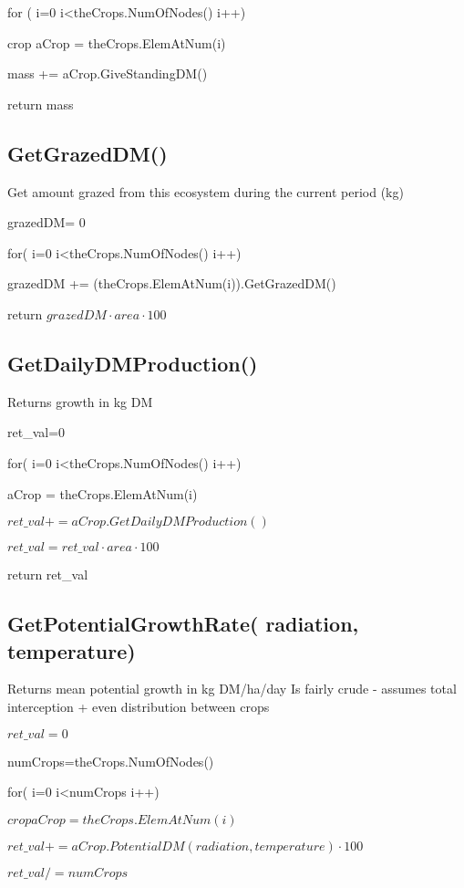 \documentclass[%
]{scrartcl}
\begin{document}
{{{  \quad 	for ( i=0 i<theCrops.NumOfNodes() i++)
   	
   \quad  \quad     crop  aCrop = theCrops.ElemAtNum(i)
         
    \quad \quad      mass += aCrop.GiveStandingDM()

   return mass


\subsection{GetGrazedDM()}
	Get amount grazed from this ecosystem during the current period (kg)
	
     grazedDM=  0
     
   for( i=0 i<theCrops.NumOfNodes() i++)
   
	 \quad	  grazedDM += (theCrops.ElemAtNum(i)).GetGrazedDM()
	 
	return $grazedDM  \cdot  area  \cdot  100$


\subsection{GetDailyDMProduction()}
Returns growth in kg DM

	  ret\_val=0
	  
   for( i=0 i<theCrops.NumOfNodes() i++)

    \quad	  aCrop = theCrops.ElemAtNum(i)
    
   \quad   $ ret\_val+=aCrop.GetDailyDMProduction()$

   $ret\_val  =ret\_val \cdot area  \cdot  100$
   
   return ret\_val

\subsection{GetPotentialGrowthRate(  radiation,   temperature)}
Returns mean potential growth in kg DM/ha/day
Is fairly crude - assumes total interception + even distribution between crops

	$  ret\_val=0$
	  
    numCrops=theCrops.NumOfNodes()
    
   for( i=0 i<numCrops i++)
   
   	 \quad $ crop    aCrop = theCrops.ElemAtNum(i)$
    
     \quad  $ret\_val+=aCrop.PotentialDM(radiation, temperature)  \cdot  100$

   $ret\_val/=numCrops$
   
}}}
\end{document}
